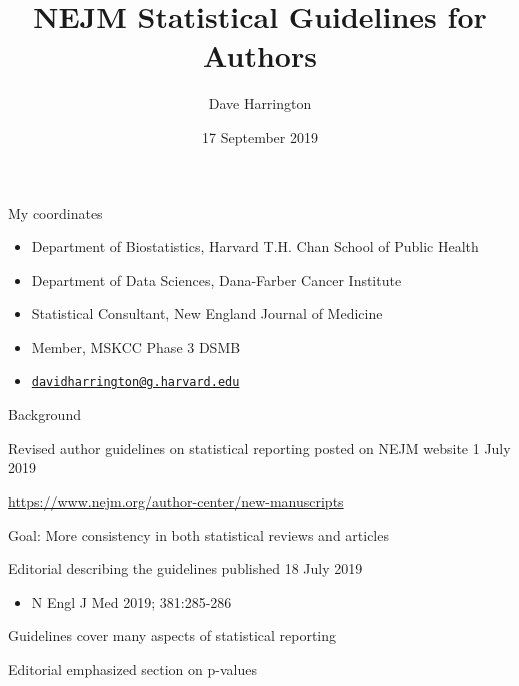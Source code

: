\documentclass[ignorenonframetext,]{beamer}
\title{NEJM Statistical Guidelines for Authors}
\author{Dave Harrington}
\date{17 September 2019}
\providecommand{\tightlist}{%
  \setlength{\itemsep}{0pt}\setlength{\parskip}{0pt}}
\begin{document}
\frame{\titlepage}

\begin{frame}{My coordinates}
\protect\hypertarget{my-coordinates}{}

\begin{itemize}
\item
  Department of Biostatistics, Harvard T.H. Chan School of Public Health
\item
  Department of Data Sciences, Dana-Farber Cancer Institute
\item
  Statistical Consultant, New England Journal of Medicine
\item
  Member, MSKCC Phase 3 DSMB
\item
  \href{mailto:davidharrington@g.harvard.edu}{\nolinkurl{davidharrington@g.harvard.edu}}
\end{itemize}

\end{frame}

\begin{frame}{Background}
\protect\hypertarget{background}{}

Revised author guidelines on statistical reporting posted on NEJM
website 1 July 2019

\url{https://www.nejm.org/author-center/new-manuscripts}

Goal: More consistency in both statistical reviews and articles

Editorial describing the guidelines published 18 July 2019

\begin{itemize}
\tightlist
\item
  N Engl J Med 2019; 381:285-286
\end{itemize}

Guidelines cover many aspects of statistical reporting

Editorial emphasized section on p-values

\end{frame}
\end{document}
